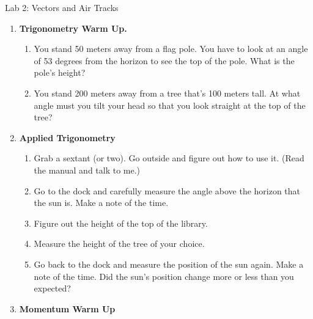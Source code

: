 
\oddsidemargin=0in
\textwidth=6.25in

\renewcommand{\arraystretch}{1.3}


\pagestyle{empty}

\begin{center}
{\large Lab 2:  Vectors and Air Tracks}\\
\end{center}


\begin{enumerate}

\item {\bf Trigonometry Warm Up.} 

\begin{enumerate}
\item You stand 50 meters away from a flag pole.
You have to look at an angle of 53 degrees from the horizon to see the
top of the pole.  What is the pole's height?

\item  You stand 200 meters away from a tree that's 100 meters tall.
At what angle must you tilt your head so that you look straight at the
top of the tree?

\end{enumerate}

\item {\bf Applied Trigonometry}

\begin{enumerate}

\item Grab a sextant (or two).  Go outside and figure out how to use
it.  (Read the manual and talk to me.)

\item Go to the dock and carefully measure the angle above the horizon
that the sun is.  Make a note of the time.

\item  Figure out the height of the top of the library.

\item  Measure the height of the tree of your choice.

\item Go back to the dock and measure the position of the sun again.
Make a note of the time.  Did the sun's position change more or less
than you expected?

\end{enumerate}


\item {\bf Momentum Warm Up}


\end{enumerate}
